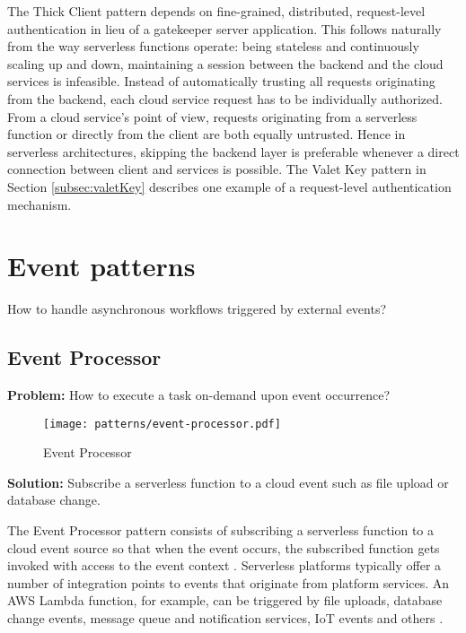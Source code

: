 The Thick Client pattern depends on fine-grained, distributed, request-level authentication in lieu of a gatekeeper server application. This follows naturally from the way serverless functions operate: being stateless and continuously scaling up and down, maintaining a session between the backend and the cloud services is infeasible. Instead of automatically trusting all requests originating from the backend, each cloud service request has to be individually authorized. From a cloud service's point of view, requests originating from a serverless function or directly from the client are both equally untrusted. Hence in serverless architectures, skipping the backend layer is preferable whenever a direct connection between client and services is possible. The Valet Key pattern in Section \ref{subsec:valetKey} describes one example of a request-level authentication mechanism. \parencite{adzic2017serverless}

\section{Event patterns} \label{sec:eventPatterns}

How to handle asynchronous workflows triggered by external events?

\subsection{Event Processor} \label{subsec:Eventprocessing}

\textbf{Problem:} How to execute a task on-demand upon event occurrence?

\begin{figure}[h]
  \centering
  \texttt{[image: patterns/event-processor.pdf]}
  \caption{Event Processor}
  \label{fig:patternEventProcessor}
\end{figure}

\textbf{Solution:} Subscribe a serverless function to a cloud event such as file upload or database change.

The Event Processor pattern consists of subscribing a serverless function to a cloud event source so that when the event occurs, the subscribed function gets invoked with access to the event context \parencite{hong18securingviaserverlesspatterns}. Serverless platforms typically offer a number of integration points to events that originate from platform services. An AWS Lambda function, for example, can be triggered by file uploads, database change events, message queue and notification services, IoT events and others \parencite{awslambda0218}.


